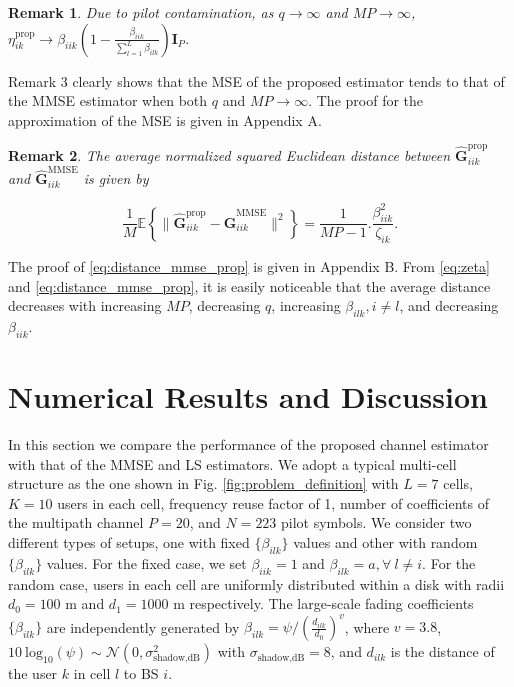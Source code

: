 \documentclass[10pt,journal,comsoc,final]{IEEEtran}
\newtheorem{remark}{Remark}
\begin{document}
\begin{remark} Due to pilot contamination, as $q \to\infty$ and $MP \to\infty$, $\eta_{ik}^{\text{prop}} \to \beta_{iik} \left( 1 - \frac{\beta_{iik}}{\sum_{l=1}^{L}{\beta_{ilk}}} \right) \textbf{I}_{P}$. \end{remark}

Remark 3 clearly shows that the MSE of the proposed estimator tends to that of the MMSE estimator when both $q$ and $MP \to\infty$. The proof for the approximation of the MSE is given in Appendix A.

\begin{remark} The average normalized squared Euclidean distance between $\hat{\textbf{G}}_{iik}^{\text{prop}}$ and $\hat{\textbf{G}}_{iik}^{\text{MMSE}}$ is given by \end{remark}
\begin{equation}\label{eq:distance_mmse_prop}
\frac{1}{M} \mathbb{E} \left\lbrace \lVert  \hat{\textbf{G}}_{iik}^{\text{prop}} - \hat{\textbf{G}}_{iik}^{\text{MMSE}} \rVert^{2} \right\rbrace = \frac{1}{MP-1} . \frac{\beta_{iik}^{2}}{\zeta_{ik}}.
\end{equation}

The proof of \eqref{eq:distance_mmse_prop} is given in Appendix B. From \eqref{eq:zeta} and \eqref{eq:distance_mmse_prop}, it is easily noticeable that the average distance decreases with increasing $MP$, decreasing $q$, increasing $\beta_{ilk}, i \neq l$, and decreasing $\beta_{iik}$.

\section{Numerical Results and Discussion}

In this section we compare the performance of the proposed channel estimator with that of the MMSE and LS estimators. We adopt a typical multi-cell structure as the one shown in Fig. \ref{fig:problem_definition} with $L = 7$ cells, $K = 10$ users in each cell, frequency reuse factor of 1, number of coefficients of the multipath channel $P = 20$, and $N = 223$ pilot symbols. We consider two different types of setups, one with fixed $\{\beta_{ilk}\}$ values and other with random $\{\beta_{ilk}\}$ values. For the fixed case, we set $\beta_{iik} = 1$ and $\beta_{ilk} = a,  \forall \  l \neq i$. For the random case, users in each cell are uniformly distributed within a disk with radii $d_{0} = 100$ m and $d_{1} = 1000$ m respectively. The large-scale fading coefficients $\{\beta_{ilk}\}$ are independently generated by $\beta_{ilk} = \psi / \left( \frac{d_{ilk}}{d_{0}}\right)^{v}$, where $v = 3.8$, $10 \ \text{log}_{10}(\psi) \sim \mathcal{N}(0,\sigma_{\text{shadow,dB}}^{2})$ with $\sigma_{\text{shadow,dB}} = 8$, and $d_{ilk}$ is the distance of the user $k$ in cell $l$ to BS $i$.
\end{document}
